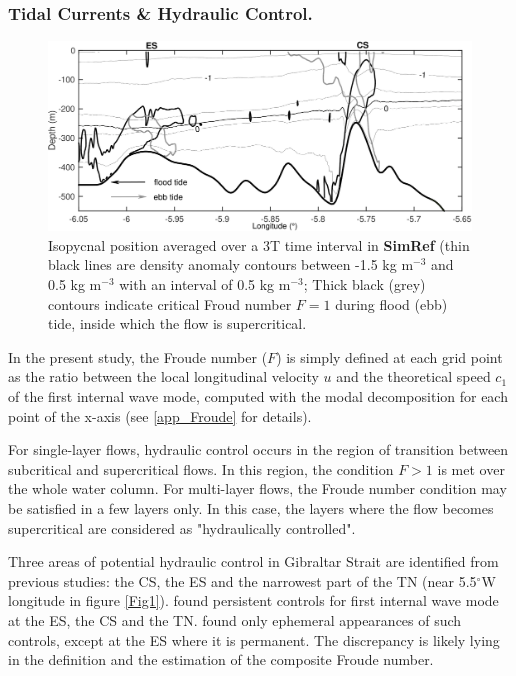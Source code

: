 \subsubsection{Tidal Currents \& Hydraulic Control.}
\label{tide_hyd}
\begin{figure}[!h]
\centering
\includegraphics[width=1\linewidth]{./GBR2D/figure5.png}
\caption{ Isopycnal position averaged over a 3T time interval in \textbf{SimRef} (thin black lines are density anomaly contours between -1.5 kg m$^{-3}$ and 0.5 kg m$^{-3}$ with an interval of 0.5 kg m$^{-3}$;  
Thick black (grey) contours indicate critical Froud number $F=1$ during flood (ebb) tide, inside which the flow is supercritical.}
\label{fig_fn_ref}
\end{figure}


In the present study, the Froude number ($F$) is simply defined at each grid point as the ratio between the local longitudinal velocity $u$ and the theoretical speed $c_1$ of the first internal wave mode, computed with the modal decomposition for each point of the x-axis (see \ref{app_Froude} for details).

For single-layer flows, hydraulic control occurs in the region of transition between subcritical and supercritical flows. In this region, the condition $F>1$ is met over the whole water column. For multi-layer flows, the Froude number condition may be satisfied in a few layers only. In this case, the layers where the flow becomes supercritical are considered as "hydraulically controlled".

Three areas of potential hydraulic control in Gibraltar Strait are identified from previous studies: the CS, the ES and the narrowest part of the TN (near 5.5$^\circ$W longitude in figure \ref{Fig1}). \citet{FA1988} found persistent controls for first internal wave mode at the ES, the CS and the TN. \citet{Sannino2009b} found only ephemeral appearances of such controls, except at the ES where it is permanent. The discrepancy is likely lying in the definition and the estimation of the composite Froude number.

